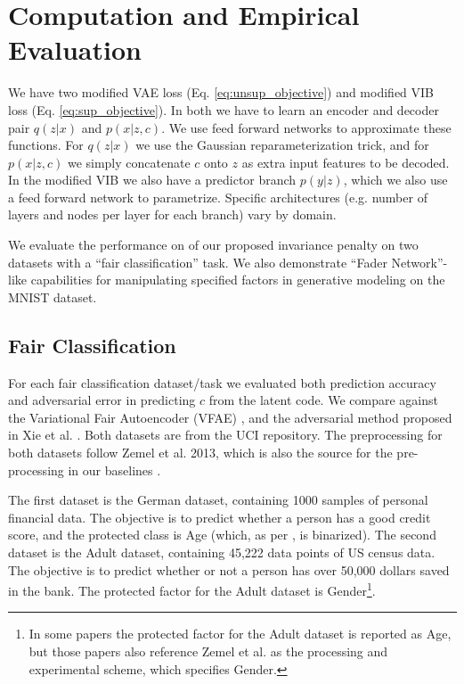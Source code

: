 
\section{Computation and Empirical Evaluation}

We have two modified VAE loss (Eq. \ref{eq:unsup_objective}) and modified VIB loss (Eq. \ref{eq:sup_objective}).
In both we have to learn an encoder and decoder pair $q(z|x)$ and $p(x|z,c)$. We use feed forward networks to approximate these functions. For $q(z|x)$ we use the Gaussian reparameterization trick, and for $p(x|z,c)$ we simply concatenate $c$ onto $z$ as extra input features to be decoded. In the modified VIB we also have a predictor branch $p(y|z)$, which we also use a feed forward network to parametrize. Specific architectures (e.g. number of layers and nodes per layer for each branch) vary by domain.

We evaluate the performance on of our proposed invariance penalty on two datasets with a ``fair classification'' task. We also demonstrate ``Fader Network''-like capabilities for manipulating specified factors in generative modeling on the MNIST dataset.

\subsection{Fair Classification}

For each fair classification dataset/task we evaluated both prediction accuracy and adversarial error in predicting $c$ from the latent code. We compare against the Variational Fair Autoencoder (VFAE) \cite{louizos2015variational}, and the adversarial method proposed in Xie et al. \cite{xie2017controllable}. Both datasets are from the UCI repository. The preprocessing for both datasets follow Zemel et al. 2013\cite{zemel2013learning}, which is also the source for the pre-processing in our baselines \cite{louizos2015variational,xie2017controllable}.

The first dataset is the German dataset, containing 1000 samples of personal financial data. The objective is to predict whether a person has a good credit score, and the protected class is Age (which, as per \cite{zemel2013learning}, is binarized). The second dataset is the Adult dataset, containing 45,222 data points of US census data. The objective is to predict whether or not a person has over 50,000 dollars saved in the bank. The protected factor for the Adult dataset is Gender\footnote{In some papers the protected factor for the Adult dataset is reported as Age, but those papers also reference Zemel et al. \cite{zemel2013learning} as the processing and experimental scheme, which specifies Gender.}.

